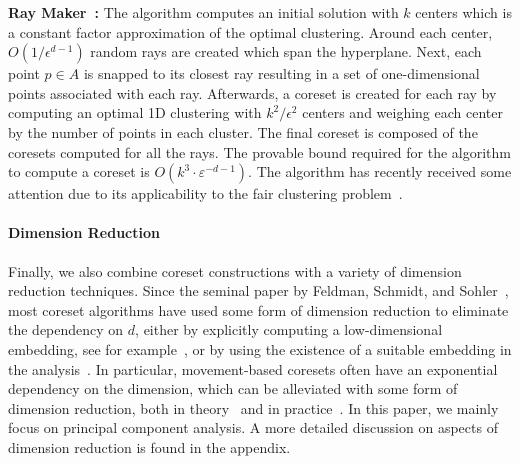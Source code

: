 {\bf Ray Maker~\cite{harpeled2007raymaker}:} The algorithm computes an initial solution with $k$ centers which is a constant factor approximation of the optimal clustering. Around each center, $O(1/\epsilon^{d-1})$ random rays are created which span the hyperplane. Next, each point $p \in A$ is snapped to its closest ray resulting in a set of one-dimensional points associated with each ray. Afterwards, a coreset is created for each ray by computing an optimal 1D clustering with $k^2/\epsilon^2$ centers and weighing each center by the number of points in each cluster. The final coreset is composed of the coresets computed for all the rays.
The provable bound required for the algorithm to compute a coreset is $O(k^3 \cdot \varepsilon^{-d-1})$. The algorithm has recently received some attention due to its applicability to the fair clustering problem~\cite{HuangJV19}.


\paragraph*{Dimension Reduction}
Finally, we also combine coreset constructions with a variety of dimension reduction techniques. Since the seminal paper by Feldman, Schmidt, and Sohler~\cite{FSS13}, most coreset algorithms have used some form of dimension reduction to eliminate the dependency on $d$, either by explicitly computing a low-dimensional embedding, see for example~\cite{FSS13,SoW18}, or by using the existence of a suitable embedding in the analysis~\cite{Cohen-AddadSS21,huang2020coresets}. In particular, movement-based coresets often have an exponential dependency on the dimension, which can be alleviated with some form of dimension reduction, both in theory~\cite{SSS19} and in practice~\cite{KappmeierS015}.
In this paper, we mainly focus on principal component analysis. A more detailed discussion on aspects of dimension reduction is found in the appendix.

